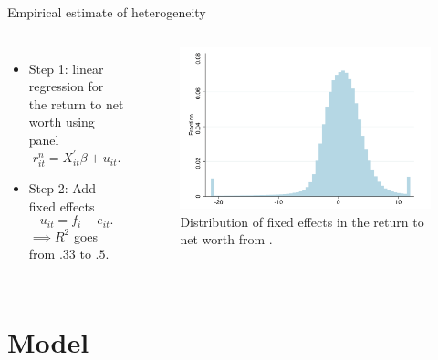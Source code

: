 \documentclass{beamer}
\begin{document}
\begin{frame}{Empirical estimate of heterogeneity}

     \begin{columns}
     \small
    \centering

    \begin{itemize}
    \item Step 1: linear regression for the return to net worth using panel
    $$ r^{n}_{it} = X^{'}_{it} \beta + u_{it}. $$
    \item Step 2: Add fixed effects
    $$ u_{it} = f_{i} + e_{it}. $$
    $\implies R^2$ goes from $.33$ to $.5$.
    \end{itemize}


    \centering
    \begin{figure}
    \includegraphics[width=\textwidth]{Figures/Fagereng2020Fig8.png}
    \captionsetup{font=scriptsize}
    \caption{Distribution of fixed effects in the return to net worth from \cite{aflgdmlp20}.}
    \end{figure}
  \end{columns}

\end{frame}

\section{Model}
\end{document}
